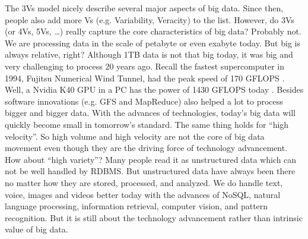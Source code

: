 \documentclass[11pt]{book}
\begin{document}
The 3Vs model nicely describe several major aspects of big data. Since then, people also add more Vs (e.g. Variability, Veracity) to the list. However, do 3Vs (or 4Vs, 5Vs, \ldots) really capture the core characteristics of big data? Probably not. We are processing data in the scale of petabyte or even exabyte today. But big is always relative, right? Although 1TB data is not that big today, it was big and very challenging to process 20 years ago. Recall the fastest supercomputer in 1994, Fujitsu Numerical Wind Tunnel, had the peak speed of 170 GFLOPS \cite{top500}. Well, a Nvidia K40 GPU in a PC has the power of 1430 GFLOPS today \cite{Nvidia2014}. Besides software innovations (e.g. GFS and MapReduce) also helped a lot to process bigger and bigger data. With the advances of technologies, today's big data will quickly become small in tomorrow's standard. The same thing holds for ``high velocity''. So high volume and high velocity are not the core of big data movement even though they are the driving force of technology advancement. How about ``high variety''? Many people read it as unstructured data which can not be well handled by RDBMS. But unstructured data have always been there no matter how they are stored, processed, and analyzed. We do handle text, voice, images and videos better today with the advances of NoSQL, natural language processing, information retrieval, computer vision, and pattern recognition. But it is still about the technology advancement rather than intrinsic value of big data.
\end{document}
